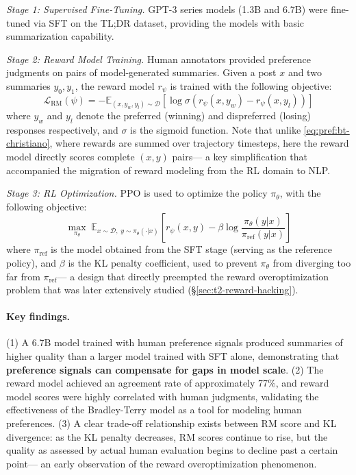 \textit{Stage 1: Supervised Fine-Tuning.}
GPT-3 series models (1.3B and 6.7B) were fine-tuned via SFT on the TL;DR dataset,
providing the models with basic summarization capability.

\textit{Stage 2: Reward Model Training.}
Human annotators provided preference judgments on pairs of model-generated summaries.
Given a post $x$ and two summaries $y_0, y_1$,
the reward model $r_\psi$ is trained with the following objective:
\begin{equation}
\label{eq:pref:rm-loss-summarize}
\mathcal{L}_{\text{RM}}(\psi) = -\mathbb{E}_{(x, y_w, y_l) \sim \mathcal{D}} \left[
  \log \sigma\!\left(r_\psi(x, y_w) - r_\psi(x, y_l)\right)
\right]
\end{equation}
where $y_w$ and $y_l$ denote the preferred (winning) and dispreferred (losing) responses respectively,
and $\sigma$ is the sigmoid function.
Note that unlike \cref{eq:pref:bt-christiano}, where rewards are summed over trajectory timesteps,
here the reward model directly scores complete $(x, y)$ pairs---
a key simplification that accompanied the migration of reward modeling from the RL domain to NLP.

\textit{Stage 3: RL Optimization.}
PPO is used to optimize the policy $\pi_\theta$, with the following objective:
\begin{equation}
\label{eq:pref:rl-obj-summarize}
\max_{\pi_\theta}\; \mathbb{E}_{x \sim \mathcal{D},\; y \sim \pi_\theta(\cdot|x)} \left[
  r_\psi(x, y) - \beta \log \frac{\pi_\theta(y|x)}{\pi_{\text{ref}}(y|x)}
\right]
\end{equation}
where $\pi_{\text{ref}}$ is the model obtained from the SFT stage (serving as the reference policy),
and $\beta$ is the KL penalty coefficient, used to prevent $\pi_\theta$ from diverging too far from $\pi_{\text{ref}}$---
a design that directly preempted the reward overoptimization problem that was later extensively studied (\S\ref{sec:t2-reward-hacking}).

\paragraph{Key findings.}
(1) A 6.7B model trained with human preference signals produced summaries of higher quality than a larger model trained with SFT alone,
demonstrating that \textbf{preference signals can compensate for gaps in model scale}.
(2) The reward model achieved an agreement rate of approximately 77\%, and reward model scores were highly correlated with human judgments,
validating the effectiveness of the Bradley-Terry model as a tool for modeling human preferences.
(3) A clear trade-off relationship exists between RM score and KL divergence:
as the KL penalty decreases, RM scores continue to rise, but the quality as assessed by actual human evaluation begins to decline past a certain point---
an early observation of the reward overoptimization phenomenon.

